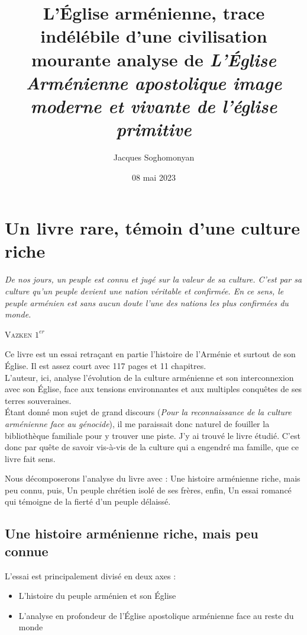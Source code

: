 \documentclass[11pt, a4paper]{report}
\author{Jacques Soghomonyan}
\title{%
    L'Église arménienne, trace indélébile d'une civilisation mourante\bigbreak
    \large analyse de \textit{L'Église Arménienne apostolique image moderne et vivante de l'église primitive}\cite{livre:principale}
}
\date{08 mai 2023}
\let\originalepigraph\epigraph
\renewcommand\epigraph[2]{\originalepigraph{\textit{#1}}{\textsc{#2}}}
\begin{document}
    \maketitle \pagebreak

    \section*{Un livre rare, témoin d'une culture riche}

    \epigraph{%
        De nos jours, un peuple est connu et jugé sur la valeur de sa culture.
        C'est par sa culture qu'un peuple devient une nation véritable et confirmée.
        En ce sens, le peuple arménien est sans aucun doute l'une des nations les plus confirmées du monde.}
    {Vazken $1^{er}$\cite{citation:catholicos,livre:principale}}

    Ce livre est un essai retraçant en partie l'histoire de l'Arménie et surtout de son Église. Il est assez court avec 117 pages et 11 chapitres.\\
    L'auteur, ici, analyse l'évolution de la culture arménienne et son interconnexion avec son Église,
    face aux tensions environnantes et aux multiples conquêtes de ses terres souveraines.\\
    Étant donné mon sujet de grand discours (\textit{Pour la reconnaissance de la culture arménienne face au génocide}),
    il me paraissait donc naturel de fouiller la bibliothèque familiale pour y trouver une piste. 
    J'y ai trouvé le livre\cite{livre:principale} étudié.
    C'est donc par quête de savoir vis-à-vis de la culture qui a engendré ma famille, que ce livre fait sens.
    \bigbreak
    
    Nous décomposerons l'analyse du livre avec : Une histoire arménienne riche, mais peu connu, puis, 
    Un peuple chrétien isolé de ses frères, enfin, 
    Un essai romancé qui témoigne de la fierté d'un peuple délaissé.

    \subsection*{Une histoire arménienne riche, mais peu connue}
    L'essai est principalement divisé en deux axes : 
    \begin{itemize}
        \item L'histoire du peuple arménien et son Église %
        \item L'analyse en profondeur de l'Église apostolique arménienne face au reste du \\ monde
    \end{itemize}
    \bigbreak
\end{document}
